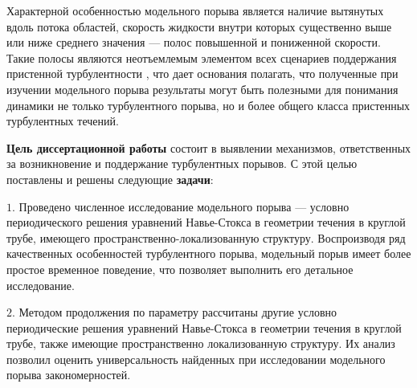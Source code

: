 Характерной особенностью модельного порыва является наличие вытянутых вдоль потока областей, скорость жидкости внутри которых существенно выше или ниже среднего значения --- полос повышенной и пониженной скорости. Такие полосы являются неотъемлемым элементом всех сценариев поддержания пристенной турбулентности \cite{Hamilton1995, Waleffe1997, Schoppa2002}, что дает основания полагать, что полученные при изучении модельного порыва результаты могут быть полезными для понимания динамики не только турбулентного порыва, но и более общего класса пристенных турбулентных течений. 



{\bf Цель диссертационной работы} состоит в выявлении механизмов, ответственных за возникновение и поддержание турбулентных порывов. 
С этой целью поставлены и решены следующие \textbf{задачи}: 

 $1.$  Проведено численное исследование модельного порыва --- условно периодического решения уравнений Навье-Стокса в геометрии течения в круглой трубе, имеющего пространственно-локализованную структуру. Воспроизводя ряд качественных особенностей турбулентного порыва, модельный порыв имеет более простое временное поведение, что позволяет выполнить его детальное исследование. 

 $2.$  Методом продолжения по параметру рассчитаны другие условно периодические решения уравнений Навье-Стокса в геометрии течения в круглой трубе, также имеющие пространственно локализованную структуру. Их анализ позволил оценить универсальность найденных при исследовании модельного порыва закономерностей. 

